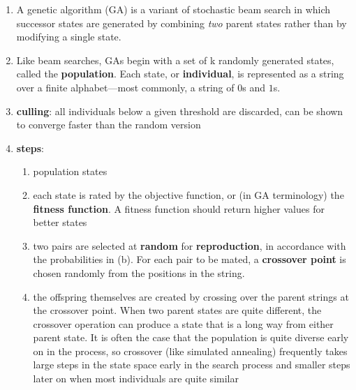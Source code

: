 \begin{enumerate}
    \item A genetic algorithm (GA) is a variant of stochastic beam search in which successor states are generated by combining \textit{two} parent states rather than by modifying a single state.
    \hfill \cite{ai/book/Artificial-Intelligence-A-Modern-Approach/Russell-Norvig}

    \item Like beam searches, GAs begin with a set of k randomly generated states, called the \textbf{population}.
    Each state, or \textbf{individual}, is represented as a string over a finite alphabet—most commonly, a string of $0$s and $1$s.
    \hfill \cite{ai/book/Artificial-Intelligence-A-Modern-Approach/Russell-Norvig}

    \item \textbf{culling}: all individuals below a given threshold are discarded, can be shown to converge faster than the random version
    \hfill \cite{ai/book/Artificial-Intelligence-A-Modern-Approach/Russell-Norvig}

    \item \textbf{steps}:
    \begin{enumerate}
        \item population states
        \hfill \cite{ai/book/Artificial-Intelligence-A-Modern-Approach/Russell-Norvig}

        \item each state is rated by the objective function, or (in GA terminology) the \textbf{fitness function}.
        A fitness function should return higher values for better states
        \hfill \cite{ai/book/Artificial-Intelligence-A-Modern-Approach/Russell-Norvig}

        \item two pairs are selected at \textbf{random} for \textbf{reproduction}, in accordance with the probabilities in (b).
        For each pair to be mated, a \textbf{crossover point} is chosen randomly from the positions in the string.
        \hfill \cite{ai/book/Artificial-Intelligence-A-Modern-Approach/Russell-Norvig}

        \item the offspring themselves are created by crossing over the parent strings at the crossover point.
        When two parent states are quite different, the crossover operation can produce a state that is a long way from either parent state.
        It is often the case that the population is quite diverse early on in the process, so crossover (like simulated annealing) frequently takes large steps in the state space early in the search process and smaller steps later on when most individuals are quite similar
        \hfill \cite{ai/book/Artificial-Intelligence-A-Modern-Approach/Russell-Norvig}


\end{enumerate}
\end{enumerate}
